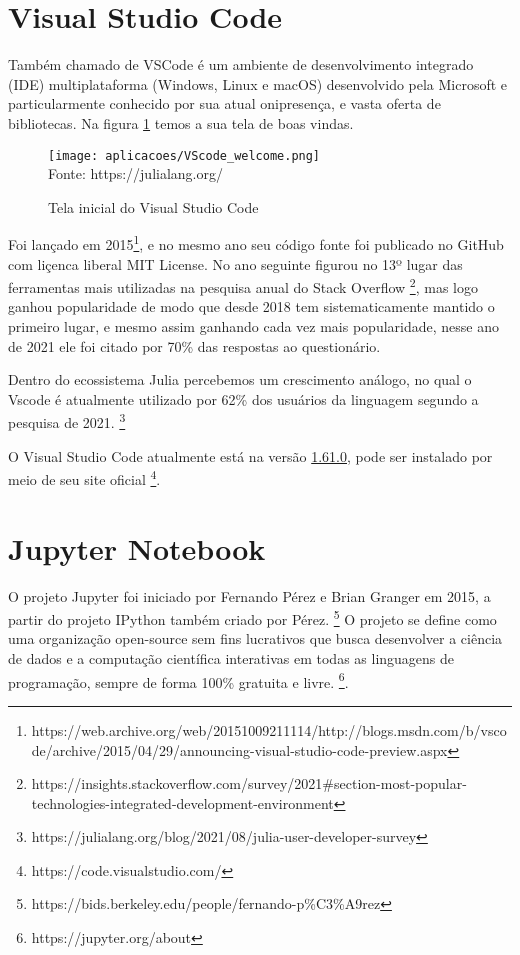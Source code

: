 \section{Visual Studio Code}
Também chamado de VSCode é um ambiente de desenvolvimento integrado (IDE) multiplataforma (Windows, Linux e macOS) desenvolvido pela Microsoft e particularmente conhecido por sua atual onipresença, e vasta oferta de bibliotecas. 
Na figura \ref{VScode_welcome} temos a sua tela de boas vindas.
\begin{figure}[H]
 \begin{center}
     \caption{Tela inicial do Visual Studio Code} \label{VScode_welcome}
     \texttt{[image: aplicacoes/VScode\_welcome.png]} \\
     {\tiny \sf Fonte: https://julialang.org/}
 \end{center}
\end{figure} 
Foi lançado em 2015\footnote{https://web.archive.org/web/20151009211114/http://blogs.msdn.com/b/vscode/archive/2015/04/29/announcing-visual-studio-code-preview.aspx}, e no mesmo ano seu código fonte foi publicado no GitHub com liçenca liberal MIT License. 
No ano seguinte figurou no 13º lugar das ferramentas mais utilizadas na pesquisa anual do Stack Overflow \footnote{https://insights.stackoverflow.com/survey/2021\#section-most-popular-technologies-integrated-development-environment}, mas logo ganhou popularidade de modo que desde 2018 tem sistematicamente mantido o primeiro lugar, e mesmo assim ganhando cada vez mais popularidade, nesse ano de 2021 ele foi citado por 70\% das respostas ao questionário. 

Dentro do ecossistema Julia percebemos um crescimento análogo, no qual o Vscode é atualmente utilizado por 62\% dos usuários da linguagem segundo a pesquisa de 2021. \footnote{https://julialang.org/blog/2021/08/julia-user-developer-survey}

O Visual Studio Code atualmente está na versão \href{https://github.com/microsoft/vscode/releases/tag/1.61.0}{1.61.0}, pode ser instalado por meio de seu site oficial \footnote{https://code.visualstudio.com/}.
\section{Jupyter Notebook}

O projeto Jupyter foi iniciado por Fernando Pérez e Brian Granger em 2015, a partir do projeto IPython também criado por Pérez. \footnote{https://bids.berkeley.edu/people/fernando-p\%C3\%A9rez}
O projeto se define como uma organização open-source sem fins lucrativos que busca desenvolver a ciência de dados e a computação científica interativas em todas as linguagens de programação, sempre de forma 100\% gratuita e livre. \footnote{https://jupyter.org/about}. 

